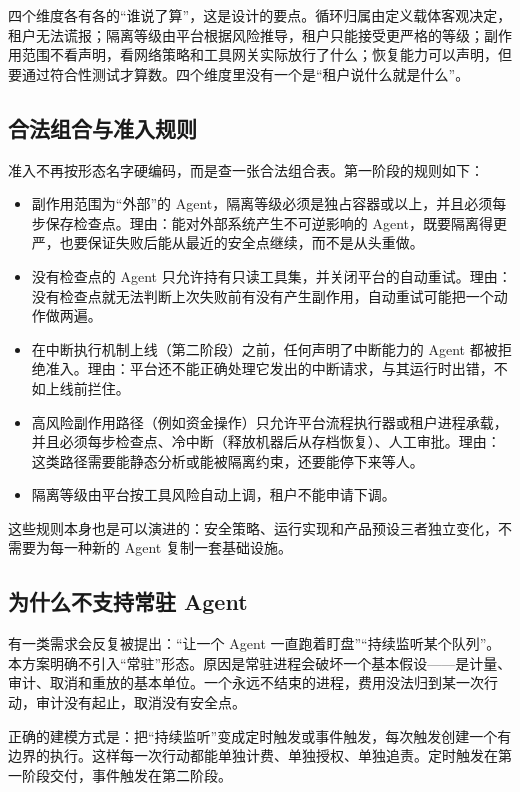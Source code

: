 四个维度各有各的“谁说了算”，这是设计的要点。循环归属由定义载体客观决定，租户无法谎报；隔离等级由平台根据风险推导，租户只能接受更严格的等级；副作用范围不看声明，看网络策略和工具网关实际放行了什么；恢复能力可以声明，但要通过符合性测试才算数。四个维度里没有一个是“租户说什么就是什么”。

\subsection{合法组合与准入规则}

准入不再按形态名字硬编码，而是查一张合法组合表。第一阶段的规则如下：

\begin{itemize}
  \item 副作用范围为“外部”的 Agent，隔离等级必须是独占容器或以上，并且必须每步保存检查点。理由：能对外部系统产生不可逆影响的 Agent，既要隔离得更严，也要保证失败后能从最近的安全点继续，而不是从头重做。
  \item 没有检查点的 Agent 只允许持有只读工具集，并关闭平台的自动重试。理由：没有检查点就无法判断上次失败前有没有产生副作用，自动重试可能把一个动作做两遍。
  \item 在中断执行机制上线（第二阶段）之前，任何声明了中断能力的 Agent 都被拒绝准入。理由：平台还不能正确处理它发出的中断请求，与其运行时出错，不如上线前拦住。
  \item 高风险副作用路径（例如资金操作）只允许平台流程执行器或租户进程承载，并且必须每步检查点、冷中断（释放机器后从存档恢复）、人工审批。理由：这类路径需要能静态分析或能被隔离约束，还要能停下来等人。
  \item 隔离等级由平台按工具风险自动上调，租户不能申请下调。
\end{itemize}

这些规则本身也是可以演进的：安全策略、运行实现和产品预设三者独立变化，不需要为每一种新的 Agent 复制一套基础设施。

\subsection{为什么不支持常驻 Agent}

有一类需求会反复被提出：“让一个 Agent 一直跑着盯盘”“持续监听某个队列”。本方案明确不引入“常驻”形态。原因是常驻进程会破坏一个基本假设——是计量、审计、取消和重放的基本单位。一个永远不结束的进程，费用没法归到某一次行动，审计没有起止，取消没有安全点。

正确的建模方式是：把“持续监听”变成定时触发或事件触发，每次触发创建一个有边界的执行。这样每一次行动都能单独计费、单独授权、单独追责。定时触发在第一阶段交付，事件触发在第二阶段。

